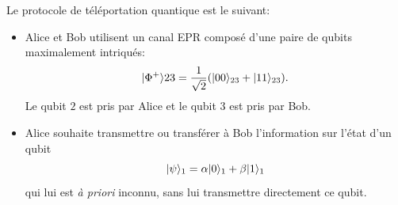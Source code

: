 Le protocole de téléportation quantique est le suivant:

\begin{itemize}
\item Alice et Bob utilisent un canal EPR composé d'une paire de qubits
maximalement intriqués:
\begin{equation}
\vert\Phi^{+}\rangle{23}=\frac{1}{\sqrt{2}}(\vert00\rangle_{23}+\vert11\rangle_{23}).
\end{equation}
Le qubit $2$ est pris par Alice et le qubit $3$ est pris par Bob.

\item Alice souhaite transmettre ou transférer à Bob l'information sur l'état
d'un qubit
\begin{equation}
\ket{\psi}_{1}=\alpha\ket{0}_{1}+\beta\ket{1} _{1}
\label{eq:Psi1Tel}%
\end{equation}
qui lui est \emph{à priori} inconnu, sans lui transmettre directement ce qubit.


\end{itemize}
